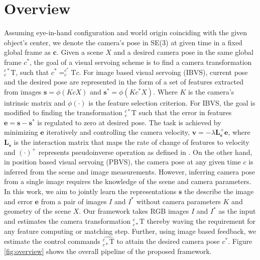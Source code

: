 \documentclass[usletter, 10 pt, conference]{ieeeconf}  %
\begin{document}
\section{Overview}
Assuming eye-in-hand configuration and world origin coinciding with the given object's center, we denote the camera's pose in SE(3) at given time in a fixed global frame as $\textbf{c}$. Given a scene $X$ and a desired camera pose in the same global frame $c^*$, the goal of a visual servoing scheme is to find a camera transformation $_{c}^{c*}\textrm{T}$, such that  $c^* = _{c}^{c^*}\textrm{T}c$. For image based visual servoing (IBVS), current pose and the desired pose are represented in the form of a set of features extracted from images $\textbf{s}=\phi(KcX)$ and $\textbf{s}^\textbf{*}=\phi(Kc^*X)$. Where $K$ is the camera's intrinsic matrix and $\phi(\cdot)$ is the feature selection criterion. For IBVS, the goal is modified to finding the transformation $_{c}^{c*}\textrm{T}$ such that the error in features $\textbf{e}=\textbf{s}-\textbf{s}^\textbf{*}$ is regulated to zero at desired pose. The task is achieved by minimizing $\textbf{e}$ iteratively and controlling the camera velocity,  $\textbf{v} = - \lambda \textbf{L}_{\textbf{s}}^+ \textbf{e}$, where $\textbf{L}_{\textbf{s}}$ is the interaction matrix that maps the rate of change of features to velocity and $(\cdot)^+$ represents pseudoinverse operation as defined in \cite{vsbasic}. On the other hand, in  position based visual servoing (PBVS), the camera pose at any given time $c$ is inferred from the scene and image measurements. However, inferring camera pose from a single image requires the knowledge of the scene and camera parameters.
\indent In this work, we aim to jointly learn the representations $\textbf{s}$ the describe the image and error $\textbf{e}$ from a pair of images $I$ and $I^*$ without camera parameters $K$ and geometry of the scene $X$. Our framework takes RGB images $I$ and $I^*$ as the input and estimates the camera transformation $_{c*}^{c}\textrm{T}$ thereby waving the requirement for any feature computing or matching step. Further, using image based feedback, we estimate the control commands $\hat{_{c*}^{c}\textrm{T}}$  to attain the desired camera pose $c^*$. Figure \ref{fig:overview} shows the overall pipeline of the proposed framework.
\end{document}

